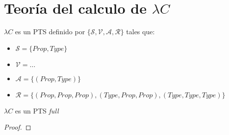 \section{Teoría del calculo de $\lambda C$ }

\begin{definition}
$\lambda C$ es un PTS definido por $\{ \mathcal{S}, \mathcal{V}, \mathcal{A}, \mathcal{R}\}$ tales que:

\begin{itemize}
    \item{} $\mathcal{S} = \{Prop,Type\}$
    \item{} $\mathcal{V} = \dots $
    \item{} $\mathcal{A} = \{(Prop, Type)\}$
    \item{} $\mathcal{R} = \{(Prop, Prop, Prop), (Type, Prop, Prop), (Type, Type, Type)\}$
\end{itemize}

\end{definition}

\begin{lemma}
$\lambda C$ es un PTS \it{full}
\end{lemma}
\begin{proof}
\end{proof}

